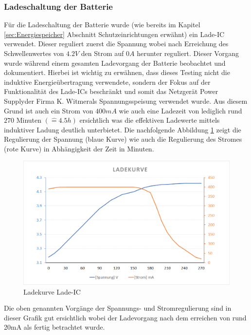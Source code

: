 \subsubsection*{Ladeschaltung der Batterie}\label{sec:batterie}
Für die Ladeschaltung der Batterie wurde (wie bereits im Kapitel \ref{sec:Energiespeicher} Abschnitt Schutzeinrichtungen erwähnt) ein Lade-IC verwendet. Dieser reguliert zuerst die Spannung wobei nach Erreichung des Schwellenwertes von $4.2V$ den Strom auf $0A$ herunter reguliert. Dieser Vorgang wurde während einem gesamten Ladevorgang der Batterie beobachtet und dokumentiert. Hierbei ist wichtig zu erwähnen, dass dieses Testing nicht die induktive Energieübertragung verwendete, sondern der Fokus auf der Funktionalität des Lade-ICs beschränkt und somit das Netzgerät \glqq Power Supply\grqq\space der Firma \glqq K. Witmer\grqq\space als Spannungsspeisung verwendet wurde. Aus diesem Grund ist auch ein Strom von $400mA$ wie auch eine Ladezeit von lediglich rund $270$ Minuten $(\hat{=} 4.5h)$ ersichtlich was die effektiven Ladewerte mittels induktiver Ladung deutlich unterbietet. Die nachfolgende Abbildung \ref{fig:LadekurveLadeIC} zeigt die Regulierung der Spannung (blaue Kurve) wie auch die Regulierung des Stromes (rote Kurve) in Abhängigkeit der Zeit in Minuten.

\begin{figure}[H]
	\begin{center}
		\includegraphics[width=120mm]{data/LadekurveLadeIC.png}
		\caption[Ladekurve Lade-IC]{Ladekurve Lade-IC} %
		\label{fig:LadekurveLadeIC}
	\end{center}
\end{figure}

Die oben genannten Vorgänge der Spannungs- und Stromregulierung sind in dieser Grafik gut ersichtlich wobei der Ladevorgang nach dem erreichen von rund 20mA als fertig betrachtet wurde.

